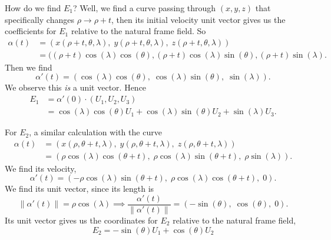 \M
How do we find $E_{1}$? Well, we find a curve passing through $(x,y,z)$
that specifically changes $\rho\to\rho+t$, then its initial velocity
unit vector gives us the coefficients for $E_{1}$ relative to the
natural frame field. So
\begin{equation}
\begin{split}
\alpha(t)
  &= (x(\rho + t,\theta,\lambda),\; y(\rho+t,\theta,\lambda),\; z(\rho+t,\theta,\lambda))\\
  &= ((\rho+t)\cos(\lambda)\cos(\theta), (\rho+t)\cos(\lambda)\sin(\theta),(\rho+t)\sin(\lambda).
\end{split}
\end{equation}
Then we find
\begin{equation}
\alpha'(t) = (\cos(\lambda)\cos(\theta),\;\cos(\lambda)\sin(\theta),\;\sin(\lambda)).
\end{equation}
We observe this \emph{is} a unit vector.
Hence
\begin{equation}
  \begin{split}
    E_{1} &= \alpha'(0)\cdot(U_{1},U_{2},U_{3})\\
    &= \cos(\lambda)\cos(\theta)U_{1} + \cos(\lambda)\sin(\theta)U_{2} + \sin(\lambda)U_{3}.
  \end{split}
\end{equation}

\M
For $E_{2}$, a similar calculation with the curve
\begin{equation}
\begin{split}
\alpha(t)
  &= (x(\rho,\theta + t,\lambda),\; y(\rho,\theta + t,\lambda),\; z(\rho,\theta + t,\lambda))\\
  &= (\rho\cos(\lambda)\cos(\theta+t),\; \rho\cos(\lambda)\sin(\theta+t),\;\rho\sin(\lambda)).
\end{split}
\end{equation}
We find its velocity,
\begin{equation}
\alpha'(t) = (-\rho\cos(\lambda)\sin(\theta+t),\;\rho\cos(\lambda)\cos(\theta+t),\;0).
\end{equation}
We find its unit vector, since its length is
\begin{equation}
\|\alpha'(t)\| =
\rho\cos(\lambda)\implies\frac{\alpha'(t)}{\|\alpha'(t)\|} = (-\sin(\theta),\;\cos(\theta),\;0).
\end{equation}
Its unit vector gives us the coordinates for $E_{2}$ relative to the
natural frame field,
\begin{equation}\label{eq:example:e2-in-spherical-coordinates}
E_{2} = -\sin(\theta)U_{1} + \cos(\theta)U_{2}
\end{equation}

